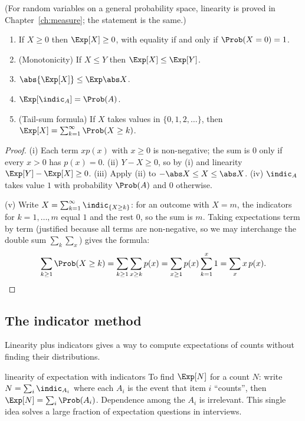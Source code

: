 (For random variables on a general probability space, linearity is proved in
Chapter~\ref{ch:measure}; the statement is the same.)

\begin{proposition}\label{prop:expprops}
\begin{enumerate}[label=(\roman*)]
\item If $X\ge0$ then $\Exp[X]\ge0$, with equality if and only if $\Prob(X=0)=1$.
\item (Monotonicity) If $X\le Y$ then $\Exp[X]\le\Exp[Y]$.
\item $\abs{\Exp[X]}\le\Exp\abs X$.
\item $\Exp[\indic_A]=\Prob(A)$.
\item (Tail-sum formula) If $X$ takes values in $\{0,1,2,\dots\}$, then
$\Exp[X]=\sum_{k=1}^\infty\Prob(X\ge k)$.
\end{enumerate}
\end{proposition}
\begin{proof}
(i) Each term $xp(x)$ with $x\ge0$ is non-negative; the sum is $0$ only if every
$x>0$ has $p(x)=0$. (ii) $Y-X\ge0$, so by (i) and linearity $\Exp[Y]-\Exp[X]\ge0$.
(iii) Apply (ii) to $-\abs X\le X\le\abs X$. (iv) $\indic_A$ takes value $1$ with
probability $\Prob(A)$ and $0$ otherwise.

(v) Write $X=\sum_{k=1}^\infty\indic_{\{X\ge k\}}$: for an outcome with $X=m$, the
indicators for $k=1,\dots,m$ equal $1$ and the rest $0$, so the sum is $m$. Taking
expectations term by term (justified because all terms are non-negative, so
we may interchange the double sum $\sum_k\sum_x$) gives the formula:
\[
\sum_{k\ge1}\Prob(X\ge k)=\sum_{k\ge1}\sum_{x\ge k}p(x)=\sum_{x\ge1}p(x)\sum_{k=1}^{x}1=\sum_xx\,p(x).\qedhere
\]
\end{proof}

\subsection*{The indicator method}

Linearity plus indicators gives a way to compute expectations of counts without
finding their distributions.

\begin{interview}{linearity of expectation with indicators}
To find $\Exp[N]$ for a count $N$: write $N=\sum_i\indic_{A_i}$ where each $A_i$ is
the event that item $i$ ``counts'', then
$\Exp[N]=\sum_i\Prob(A_i)$. Dependence among the $A_i$ is irrelevant. This
single idea solves a large fraction of expectation questions in interviews.
\end{interview}

